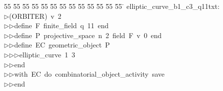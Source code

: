 %
%
\begin{tabbing}
55 \= 55 \= 55 \= 55 \= 55 \= 55 \= 55 \= 55 \= 55 \= 55 \= 55 \= 55 \= 55 \= \kill
elliptic\_curve\_b1\_c3\_q11txt:\\[0pt]
$\triangleright$\>(ORBITER)\ v\ 2\ \\[0pt]
$\triangleright$\>$\triangleright$\>define\ F\ finite\_field\ q\ 11\ end\ \\[0pt]
$\triangleright$\>$\triangleright$\>define\ P\ projective\_space\ n\ 2\ field\ F\ v\ 0\ end\ \\[0pt]
$\triangleright$\>$\triangleright$\>define\ EC\ geometric\_object\ P\ \\[0pt]
$\triangleright$\>$\triangleright$\>$\triangleright$\>elliptic\_curve\ 1\ 3\ \\[0pt]
$\triangleright$\>$\triangleright$\>end\ \\[0pt]
$\triangleright$\>$\triangleright$\>with\ EC\ do\ combinatorial\_object\_activity\ save\ \\[0pt]
$\triangleright$\>$\triangleright$\>end\\[0pt]
\end{tabbing}
